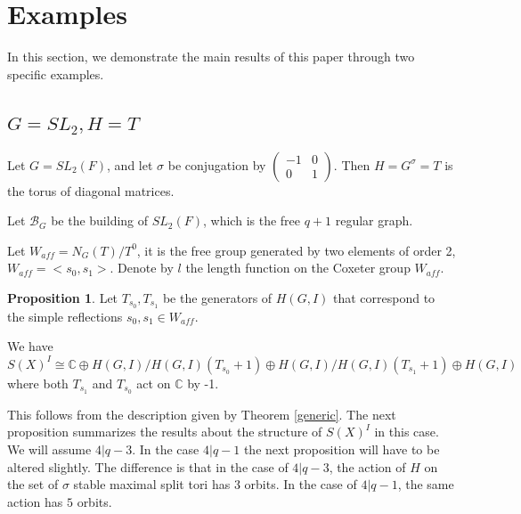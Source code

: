\documentclass[12pt]{article}
\newcommand{\B}{\mathcal{B}}
\newcommand{\<}{\langle}
\renewcommand{\>}{\rangle}
\theoremstyle{plain}
\theoremstyle{definition}
\newtheorem{prop}[theorem]{Proposition}
\begin{document}
\section{Examples}

In this section, we demonstrate the main results of this paper through two specific examples.

\subsection{$G=SL_2,H=T$}
Let $G=SL_2(F)$, and let $\sigma$ be conjugation by $\begin{pmatrix}
        -1 & 0  \\
        0 & 1
        \end{pmatrix}$. Then $H=G^\sigma=T$ is the torus of diagonal matrices. 
        
        Let $\B_G$ be the building of $SL_2(F)$, which is the free $q+1$ regular graph. 
        
        Let $W_{aff}=N_G(T)/T^0$, it is the free group generated by two elements of order 2, $W_{aff}=<s_0,s_1>$. Denote by $l$ the length function on the Coxeter group $W_{aff}$.
        
        
\begin{prop}\label{8.1}
Let $T_{s_0},T_{s_1}$ be the generators of $H(G,I)$ that correspond to the simple reflections $s_0,s_1\in W_{aff}$.


We have $S(X)^I\cong \mathbb{C}\oplus H(G,I)/H(G,I)(T_{s_0}+1)\oplus H(G,I)/H(G,I)(T_{s_1}+1)\oplus H(G,I)$ where  both $T_{s_1}$ and $T_{s_0}$ act on $\mathbb{C}$ by -1.
\end{prop}

This follows from the description given by Theorem \ref{generic}. The next proposition summarizes the results about the structure of $S(X)^I$ in this case. We will assume $4|q-3$. In the case $4|q-1$ the next proposition will have to be altered slightly. The difference is that in the case of $4|q-3$, the action of $H$ on the set of $\sigma$ stable maximal split tori has $3$ orbits. In the case of $4|q-1$, the same action has $5$ orbits.
        
\end{document}
